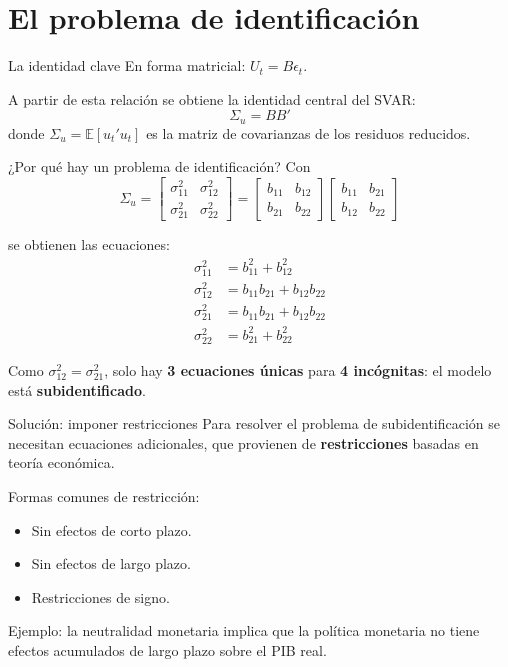 \documentclass[11pt]{beamer}
\begin{document}
\section{El problema de identificación}

\begin{frame}{La identidad clave}
En forma matricial: $U_t = B \epsilon_t$.

A partir de esta relación se obtiene la identidad central del SVAR:
\[
\Sigma_u = B B'
\]
donde $\Sigma_u = \mathbb{E}[u_t' u_t]$ es la matriz de covarianzas de los residuos reducidos.
\end{frame}

\begin{frame}{¿Por qué hay un problema de identificación?}
Con
\[
\Sigma_u = \begin{bmatrix} \sigma^2_{11} & \sigma^2_{12} \\ \sigma^2_{21} & \sigma^2_{22} \end{bmatrix}
= \begin{bmatrix} b_{11} & b_{12} \\ b_{21} & b_{22} \end{bmatrix}
\begin{bmatrix} b_{11} & b_{21} \\ b_{12} & b_{22} \end{bmatrix}
\]

se obtienen las ecuaciones:
\begin{align*}
\sigma^2_{11} &= b_{11}^2 + b_{12}^2\\
\sigma^2_{12} &= b_{11}b_{21} + b_{12}b_{22}\\
\sigma^2_{21} &= b_{11}b_{21} + b_{12}b_{22}\\
\sigma^2_{22} &= b_{21}^2 + b_{22}^2
\end{align*}

Como $\sigma^2_{12}=\sigma^2_{21}$, solo hay \textbf{3 ecuaciones únicas} para \textbf{4 incógnitas}: el modelo está \textbf{subidentificado}.
\end{frame}

\begin{frame}{Solución: imponer restricciones}
Para resolver el problema de subidentificación se necesitan ecuaciones adicionales, que provienen de \textbf{restricciones} basadas en teoría económica.

Formas comunes de restricción:
\begin{itemize}
    \item Sin efectos de corto plazo.
    \item Sin efectos de largo plazo.
    \item Restricciones de signo.
\end{itemize}

\vspace{0.3cm}
Ejemplo: la neutralidad monetaria implica que la política monetaria no tiene efectos acumulados de largo plazo sobre el PIB real.
\end{frame}
\end{document}
